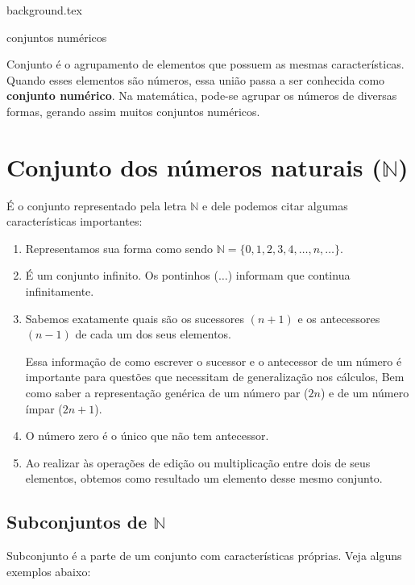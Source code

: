 \documentclass[10pt]{article}
\begin{document}
    {background.tex} %
        \begin{center}
            {\LARGE {\sc conjuntos numéricos}}
        \end{center}

\begin{definicao}
Conjunto é o agrupamento de elementos que possuem as mesmas características. Quando esses elementos são números, essa união passa a ser conhecida como \textbf{conjunto numérico}. Na matemática, pode-se agrupar os números de diversas formas, gerando assim muitos conjuntos numéricos.
\end{definicao}

\section*{Conjunto dos números naturais (\( \mathbb{N} \))}
É o conjunto representado pela letra \( \mathbb{N}\) e dele podemos citar algumas características importantes:

    \begin{enumerate}[label=\textbf{(\Roman*)}]
        \item Representamos sua forma como sendo \( \mathbb{N} = \{0, 1, 2, 3, 4, \ldots, n, \ldots\}\).
        \item É um conjunto infinito. Os pontinhos (\(\ldots\)) informam que continua infinitamente.
        \item Sabemos exatamente quais são os sucessores \((n+1)\) e os antecessores \((n-1)\) de cada um dos seus elementos.
        
        \begin{obs}
        Essa informação de como escrever o sucessor e o antecessor de um número é importante para questões que necessitam de generalização nos cálculos, Bem como saber a representação genérica de um número par (\(2n\)) e de um número ímpar (\(2n+1\)).
        \end{obs}
        \item O número zero é o único que não tem antecessor.
        \item Ao realizar às operações de edição ou multiplicação entre dois de seus elementos, obtemos como resultado um elemento desse mesmo conjunto.
    \end{enumerate}
\subsection*{Subconjuntos de \( \mathbb{N} \)}
Subconjunto é a parte de um conjunto com características próprias. Veja alguns exemplos abaixo:
\end{document}
